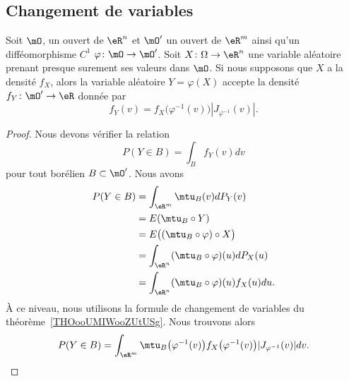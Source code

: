 \subsection{Changement de variables}

\begin{theorem}     \label{THOooDSTYooXMWfNw}
	Soit \( \mO\), un ouvert de \( \eR^n\) et \( \mO'\) un ouvert de \( \eR^m\) ainsi qu'un difféomorphisme \( C^1\) \( \varphi\colon \mO\to \mO'\). Soit \( X\colon \Omega\to \eR^n\) une variable aléatoire prenant presque surement ses valeurs dans \( \mO\). Si nous supposons que \( X\) a la densité \( f_X\), alors la variable aléatoire \( Y=\varphi(X)\) accepte la densité \( f_Y\colon \mO'\to \eR\) donnée par
	\begin{equation}
		f_Y(v)=f_X\big( \varphi^{-1}(v) \big)| J_{\varphi^{-1}}(v) |.
	\end{equation}
\end{theorem}

\begin{proof}
	Nous devons vérifier la relation
	\begin{equation}
		P(Y\in B)=\int_Bf_Y(v)dv
	\end{equation}
	pour tout borélien \( B\subset \mO'\). Nous avons
	\begin{subequations}
		\begin{align}
			P(Y\in B) & =\int_{\eR^m}\mtu_{B}(v)dP_Y(v)                \\
			          & =E(\mtu_B\circ Y)                              \\
			          & =E\big( (\mtu_B\circ \varphi)\circ X\big)      \\
			          & =\int_{\eR^n}(\mtu_B\circ\varphi)(u)dP_X(u)    \\
			          & =\int_{\eR^n}(\mtu_B \circ\varphi)(u)f_X(u)du.
		\end{align}
	\end{subequations}
	À ce niveau, nous utilisons la formule de changement de variables du théorème~\ref{THOooUMIWooZUtUSg}. Nous trouvons alors
	\begin{equation}
		P(Y\in B)=\int_{\eR^m}\mtu_B\big( \varphi^{-1}(v) \big)f_X\big( \varphi^{-1}(v) \big)| J_{\varphi^{-1}}(v) |dv.
	\end{equation}
\end{proof}

